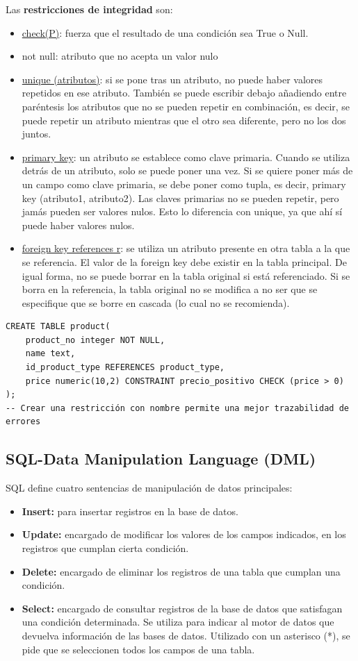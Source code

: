 Las \textbf{restricciones de integridad} son: 
\begin{itemize}
\item \underline{check(P)}: fuerza que el resultado de una condición sea True o Null.
\item not null: atributo que no acepta un valor nulo
\item \underline{unique (atributos)}: si se pone tras un atributo, no puede haber valores repetidos en ese atributo. También se puede escribir debajo añadiendo entre paréntesis los atributos que no se pueden repetir en combinación, es decir, se puede repetir un atributo mientras que el otro sea diferente, pero no los dos juntos. 
\item \underline{primary key}: un atributo se establece como clave primaria. Cuando se utiliza detrás de un atributo, solo se puede poner una vez. Si se quiere poner más de un campo como clave primaria, se debe poner como tupla, es decir, primary key (atributo1, atributo2). Las claves primarias no se pueden repetir, pero jamás pueden ser valores nulos. Esto lo diferencia con unique, ya que ahí sí puede haber valores nulos. 
\item \underline{foreign key references r}: se utiliza un atributo presente en otra tabla a la que se referencia. El valor de la foreign key debe existir en la tabla principal. De igual forma, no se puede borrar en la tabla original si está referenciado. Si se borra en la referencia, la tabla original no se modifica a no ser que se especifique que se borre en cascada (lo cual no se recomienda).
\end{itemize}
\begin{lstlisting}
CREATE TABLE product(
	product_no integer NOT NULL,
	name text,
	id_product_type REFERENCES product_type,
	price numeric(10,2) CONSTRAINT precio_positivo CHECK (price > 0) 
);
-- Crear una restricción con nombre permite una mejor trazabilidad de errores
\end{lstlisting}

\subsection{SQL-Data Manipulation Language (DML)}
SQL define cuatro sentencias de manipulación de datos principales:
\begin{itemize}
\item \textbf{Insert:} para insertar registros en la base de datos.
\item \textbf{Update:} encargado de modificar los valores de los campos indicados, en los registros que cumplan cierta condición.
\item \textbf{Delete:} encargado de eliminar los registros de una tabla que cumplan una condición.
\item \textbf{Select:} encargado de consultar registros de la base de datos que satisfagan una condición determinada. Se utiliza para indicar al motor de datos que devuelva información de las bases de datos. Utilizado con un asterisco (*), se pide que se seleccionen todos los campos de una tabla.
\end{itemize}

